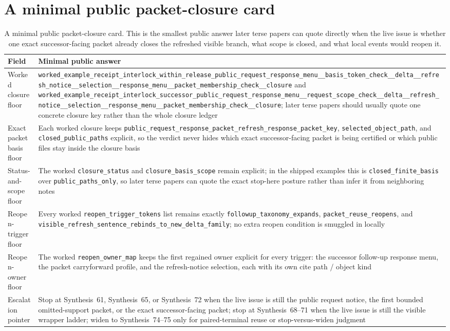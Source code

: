\documentclass[11pt]{article}
\begin{document}
\section{A minimal public packet-closure card}
\begin{table}[t]
\centering
\small
\begin{tabularx}{\linewidth}{@{}lX@{}}
\toprule
Field & Minimal public answer \\
\midrule
Worked closure floor & \nolinkurl{worked_example_receipt_interlock_within_release_public_request_response_menu__basis_token_check__delta__refresh_notice__selection__response_menu__packet_membership_check__closure} and \nolinkurl{worked_example_receipt_interlock_successor_public_request_response_menu__request_scope_check__delta__refresh_notice__selection__response_menu__packet_membership_check__closure}; later terse papers should usually quote one concrete closure key rather than the whole closure ledger \\
Exact packet basis floor & Each worked closure keeps \nolinkurl{public_request_response_packet_refresh_response_packet_key}, \nolinkurl{selected_object_path}, and \nolinkurl{closed_public_paths} explicit, so the verdict never hides which exact successor-facing packet is being certified or which public files stay inside the closure basis \\
Status-and-scope floor & The worked \nolinkurl{closure_status} and \nolinkurl{closure_basis_scope} remain explicit; in the shipped examples this is \nolinkurl{closed_finite_basis} over \nolinkurl{public_paths_only}, so later terse papers can quote the exact stop-here posture rather than infer it from neighboring notes \\
Reopen-trigger floor & Every worked \nolinkurl{reopen_trigger_tokens} list remains exactly \nolinkurl{followup_taxonomy_expands}, \nolinkurl{packet_reuse_reopens}, and \nolinkurl{visible_refresh_sentence_rebinds_to_new_delta_family}; no extra reopen condition is smuggled in locally \\
Reopen-owner floor & The worked \nolinkurl{reopen_owner_map} keeps the first regained owner explicit for every trigger: the successor follow-up response menu, the packet carryforward profile, and the refresh-notice selection, each with its own cite path / object kind \\
Escalation pointer & Stop at Synthesis~61, Synthesis~65, or Synthesis~72 when the live issue is still the public request notice, the first bounded omitted-support packet, or the exact successor-facing packet; stop at Synthesis~68--71 when the live issue is still the visible wrapper ladder; widen to Synthesis~74--75 only for paired-terminal reuse or stop-versus-widen judgment \\
\bottomrule
\end{tabularx}
\caption{A minimal public packet-closure card. This is the smallest public answer later terse papers can quote directly when the live issue is whether one exact successor-facing packet already closes the refreshed visible branch, what scope is closed, and what local events would reopen it.}
\label{tab:minimal-public-packet-closure-card}
\end{table}
\end{document}
